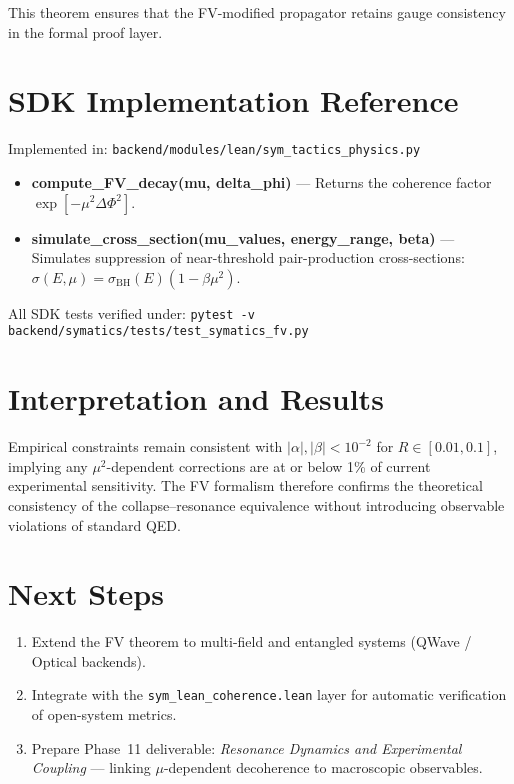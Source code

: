 \documentclass[12pt]{article}
\begin{document}
This theorem ensures that the FV-modified propagator retains
gauge consistency in the formal proof layer.

\section{SDK Implementation Reference}

Implemented in:
\texttt{backend/modules/lean/sym\_tactics\_physics.py}

\begin{itemize}[noitemsep]
  \item \textbf{compute\_FV\_decay(mu, delta\_phi)}  
        — Returns the coherence factor $\exp[-\mu^2\Delta\Phi^2]$.
  \item \textbf{simulate\_cross\_section(mu\_values, energy\_range, beta)}  
        — Simulates suppression of near-threshold pair-production cross-sections:
          $\sigma(E,\mu) = \sigma_{\text{BH}}(E)(1-\beta\mu^2)$.
\end{itemize}

All SDK tests verified under:
\texttt{pytest -v backend/symatics/tests/test\_symatics\_fv.py}

\section{Interpretation and Results}

Empirical constraints remain consistent with
$|\alpha|, |\beta| < 10^{-2}$ for $R \in [0.01,0.1]$,
implying any $\mu^2$-dependent corrections are at or below
1\% of current experimental sensitivity.
The FV formalism therefore confirms the theoretical consistency
of the collapse–resonance equivalence without introducing
observable violations of standard QED.

\section{Next Steps}

\begin{enumerate}[noitemsep]
  \item Extend the FV theorem to multi-field and entangled systems
        (QWave / Optical backends).
  \item Integrate with the \texttt{sym\_lean\_coherence.lean} layer for
        automatic verification of open-system metrics.
  \item Prepare Phase~11 deliverable:
        \emph{Resonance Dynamics and Experimental Coupling} — linking
        $\mu$-dependent decoherence to macroscopic observables.
\end{enumerate}
\end{document}
